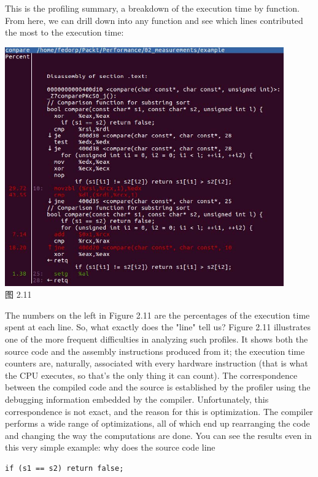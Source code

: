 This is the profiling summary, a breakdown of the execution time by function. From here, we can drill down into any function and see which lines contributed the most to the execution time:

\begin{center}
\includegraphics[width=0.9\textwidth]{content/1/chapter2/images/11.jpg}\\
图 2.11
\end{center}

The numbers on the left in Figure 2.11 are the percentages of the execution time spent at each line. So, what exactly does the "line" tell us? Figure 2.11 illustrates one of the more frequent difficulties in analyzing such profiles. It shows both the source code and the assembly instructions produced from it; the execution time counters are, naturally, associated with every hardware instruction (that is what the CPU executes, so that's the only thing it can count). The correspondence between the compiled code and the source is established by the profiler using the debugging information embedded by the compiler. Unfortunately, this correspondence is not exact, and the reason for this is optimization. The compiler performs a wide range of optimizations, all of which end up rearranging the code and changing the way the computations are done. You can see the results even in this very simple example: why does the source code line

\begin{lstlisting}[style=styleCXX]
if (s1 == s2) return false;
\end{lstlisting}

